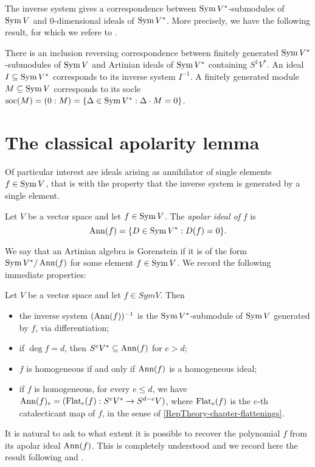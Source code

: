 The inverse system gives a correspondence between $\operatorname{Sym} V^*$-submodules of $\operatorname{Sym} V$ and $0$-dimensional ideals of $\operatorname{Sym} V^*$. More precisely, we have the following result, for which we refere to \cite[Theorem 21.6]{Eis95}.
\begin{theorem}
 \label{apolarity-theorem-MacaulayCorrespondence}
There is an inclusion reversing correspondence between finitely generated $\operatorname{Sym} V^*$-submodules of $\operatorname{Sym} V$ and Artinian ideals of $\operatorname{Sym} V^*$ containing $S^1 V^*$. An ideal $I \subseteq \operatorname{Sym} V^*$ corresponds to its inverse system $I^{-1}$. A finitely generated module $M \subseteq \operatorname{Sym} V$ corresponds to its socle $\operatorname{soc}(M) = (0: M) = \{ \Delta \in \operatorname{Sym} V^*: \Delta \cdot M = 0\}$.
\end{theorem}

\section{The classical apolarity lemma}
\label{apolarity-section-apolarityLemma}

Of particular interest are ideals arising as annihilator of single elements $f \in \operatorname{Sym} V$, that is with the property that the inverse system is generated by a single element. 
\begin{definition}
\label{apolarity-definition-apolarIdeal}
Let $V$ be a vector space and let $f \in \operatorname{Sym} V$. The {\it apolar ideal of} $f$ is
\[
\operatorname{Ann}(f) = \{ D \in \operatorname{Sym} V^* : D (f) = 0 \}.
\]
\end{definition}
We say that an Artinian algebra is Gorenstein if it is of the form $\operatorname{Sym} V^* / \operatorname{Ann}(f)$ for some element $f \in \operatorname{Sym} V$.  We record the following immediate properties:
\begin{lemma}
\label{apolarity-definition-apolarIdealBasics}
Let $V$ be a vector space and let $f \in Sym V$. Then
\begin{itemize}
\item the inverse system $(\operatorname{Ann}(f))^{-1}$ is the $\operatorname{Sym} V^*$-submodule of $\operatorname{Sym} V$ generated by $f$, via differentiation;
 \item if $\deg f = d$, then $S^e V^* \subseteq \operatorname{Ann}(f)$ for $e > d$;
\item $f$ is homogeneous if and only if $\operatorname{Ann}(f)$ is a homogeneous ideal;
\item if $f$ is homogeneous, for every $e \leq d$, we have $\operatorname{Ann}(f)_e = (\mathrm{Flat}_e(f) : S^e V^* \to S^{d-e} V)$, where $\mathrm{Flat}_e(f)$ is the $e$-th catalecticant map of $f$, in the sense of \ref{RepTheory-chapter-flattenings}.
\end{itemize}
\end{lemma}
It is natural to ask to what extent it is possible to recover the polynomial $f$ from its apolar ideal $\operatorname{Ann}(f)$. This is completely understood and we record here the result following \cite[Lemma 3.33A]{IE78} and \cite[Prop. 2.14]{Jel17}.

